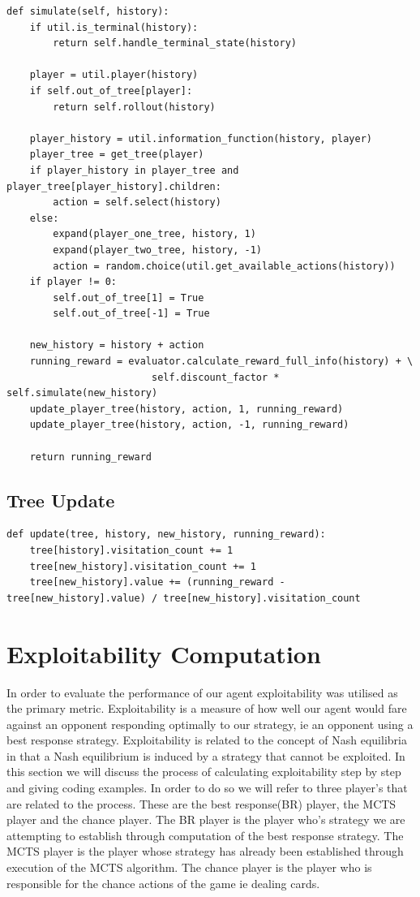 \begin{lstlisting}[style=Python]
def simulate(self, history):
    if util.is_terminal(history):
        return self.handle_terminal_state(history)

    player = util.player(history)
    if self.out_of_tree[player]:
        return self.rollout(history)

    player_history = util.information_function(history, player)
    player_tree = get_tree(player)
    if player_history in player_tree and player_tree[player_history].children:
        action = self.select(history)
    else:
        expand(player_one_tree, history, 1)
        expand(player_two_tree, history, -1)
        action = random.choice(util.get_available_actions(history))
    if player != 0:
        self.out_of_tree[1] = True
        self.out_of_tree[-1] = True

    new_history = history + action
    running_reward = evaluator.calculate_reward_full_info(history) + \
                         self.discount_factor * self.simulate(new_history)
    update_player_tree(history, action, 1, running_reward)
    update_player_tree(history, action, -1, running_reward)

    return running_reward
\end{lstlisting}


\subsection{Tree Update}\label{subsec:treeUpdate}

\begin{lstlisting}[style=Python]
def update(tree, history, new_history, running_reward):
    tree[history].visitation_count += 1
    tree[new_history].visitation_count += 1
    tree[new_history].value += (running_reward - tree[new_history].value) / tree[new_history].visitation_count
\end{lstlisting}

\section{Exploitability Computation}\label{sec:bestResponseComputation}
In order to evaluate the performance of our agent exploitability was utilised as the primary metric.
Exploitability is a measure of how well our agent would fare against an opponent responding
optimally to our strategy, ie an opponent using a best response strategy.
Exploitability is related to the concept of Nash equilibria in that a Nash equilibrium
is induced by a strategy that cannot be exploited.
In this section we will discuss the process of calculating exploitability step by step and giving coding examples.
In order to do so we will refer to three player's that are related to the process.
These are the best response(BR) player, the MCTS player and the chance player.
The BR player is the player who's strategy we are attempting to establish through computation
of the best response strategy.
The MCTS player is the player whose strategy has already been established through execution of the MCTS algorithm.
The chance player is the player who is responsible for the chance actions of the game ie dealing cards.

